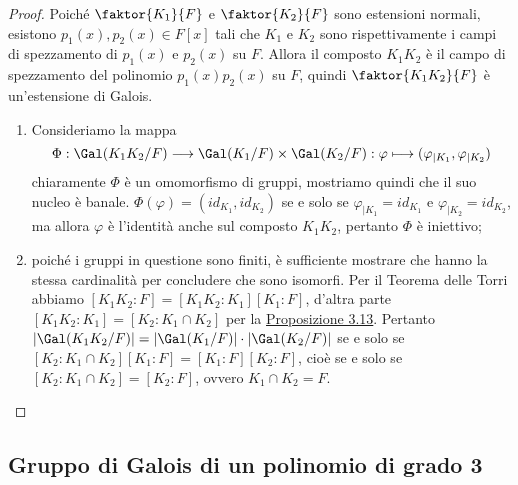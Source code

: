 \documentclass[11pt]{scrartcl}
\begin{document}
\begin{proof}
    Poiché $\faktor{K_1}{F}$ e $\faktor{K_2}{F}$ sono estensioni normali, 
    esistono $p_1(x), p_2(x) \in F[x]$ tali che $K_1$ e $K_2$ 
    sono rispettivamente i campi di spezzamento di $p_1(x)$ e $p_2(x)$ su 
    $F$. Allora il composto $K_1K_2$ è il campo di spezzamento  
    del polinomio $p_1(x)p_2(x)$ su $F$, quindi $\faktor{K_1K_2}{F}$ è un'estensione 
    di Galois.
    \begin{enumerate}[(1)]
        \item Consideriamo la mappa
        \[
            \Phi: \Gal(K_1K_2/F)\longrightarrow \Gal(K_1/F)\times 
            \Gal(K_2/F): \varphi\longmapsto (\varphi_{\mid K_1}, \varphi_{\mid K_2})
        \]
        chiaramente $\Phi$ è un omomorfismo di gruppi, mostriamo quindi che 
        il suo nucleo è banale. $\Phi(\varphi) = (id_{K_1}, id_{K_2})$
        se e solo se $\varphi_{\mid K_1} = id_{K_1}$ e $\varphi_{\mid K_2} =
        id_{K_2}$, ma allora $\varphi$ è l'identità anche sul composto
        $K_1K_2$, pertanto $\Phi$ è iniettivo;
        \item poiché i gruppi in questione sono finiti, è sufficiente mostrare 
        che hanno la stessa cardinalità per concludere che sono isomorfi.
        Per il Teorema delle Torri abbiamo $[K_1K_2:F] = [K_1K_2:K_1][K_1:F]$,
        d'altra parte $[K_1K_2:K_1] = [K_2:K_1\cap K_2]$ per
        la \hyperref[prop3.13]{Proposizione 3.13}. Pertanto $|\Gal(K_1K_2/F)| =
        |\Gal(K_1/F)|\cdot |\Gal(K_2/F)|$ 
        se e solo se $[K_2:K_1\cap K_2][K_1:F] = [K_1:F][K_2:F]$, cioè se e 
        solo se $[K_2:K_1\cap K_2] = [K_2:F]$, ovvero $K_1\cap K_2 = F$.
    \end{enumerate}
\end{proof}

\newpage

\subsection{Gruppo di Galois di un polinomio di grado 3}
\end{document}

